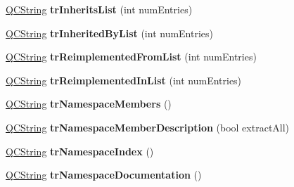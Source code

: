 \begin{DoxyCompactItemize}
\item 
\hypertarget{class_translator_dutch_a2aae6b7b421f034541d3890c830a5b87}{\hyperlink{class_q_c_string}{Q\-C\-String} {\bfseries tr\-Inherits\-List} (int num\-Entries)}\label{class_translator_dutch_a2aae6b7b421f034541d3890c830a5b87}

\item 
\hypertarget{class_translator_dutch_a1e99444f13f4aaf4381915a7ef64b7e2}{\hyperlink{class_q_c_string}{Q\-C\-String} {\bfseries tr\-Inherited\-By\-List} (int num\-Entries)}\label{class_translator_dutch_a1e99444f13f4aaf4381915a7ef64b7e2}

\item 
\hypertarget{class_translator_dutch_a415a7fcbadfe96bd0ca26878e710c148}{\hyperlink{class_q_c_string}{Q\-C\-String} {\bfseries tr\-Reimplemented\-From\-List} (int num\-Entries)}\label{class_translator_dutch_a415a7fcbadfe96bd0ca26878e710c148}

\item 
\hypertarget{class_translator_dutch_a03896d92ba89b64025ceb367fda22ffb}{\hyperlink{class_q_c_string}{Q\-C\-String} {\bfseries tr\-Reimplemented\-In\-List} (int num\-Entries)}\label{class_translator_dutch_a03896d92ba89b64025ceb367fda22ffb}

\item 
\hypertarget{class_translator_dutch_aab3cb0a2b1911abb6aaa26098a2ba334}{\hyperlink{class_q_c_string}{Q\-C\-String} {\bfseries tr\-Namespace\-Members} ()}\label{class_translator_dutch_aab3cb0a2b1911abb6aaa26098a2ba334}

\item 
\hypertarget{class_translator_dutch_aee9c71c61972950fb45524dbecfa54f9}{\hyperlink{class_q_c_string}{Q\-C\-String} {\bfseries tr\-Namespace\-Member\-Description} (bool extract\-All)}\label{class_translator_dutch_aee9c71c61972950fb45524dbecfa54f9}

\item 
\hypertarget{class_translator_dutch_a3366fecf1ff5ff616f74822b96b0d9fb}{\hyperlink{class_q_c_string}{Q\-C\-String} {\bfseries tr\-Namespace\-Index} ()}\label{class_translator_dutch_a3366fecf1ff5ff616f74822b96b0d9fb}

\item 
\hypertarget{class_translator_dutch_a4b378c543e22d6041d618cffdb734842}{\hyperlink{class_q_c_string}{Q\-C\-String} {\bfseries tr\-Namespace\-Documentation} ()}\label{class_translator_dutch_a4b378c543e22d6041d618cffdb734842}


\end{DoxyCompactItemize}
